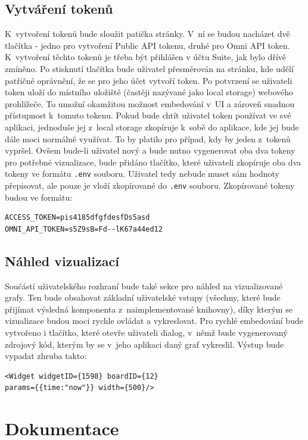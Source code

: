 \documentclass[czech, bc, kiv, he, iso690numb]{fasthesis}
\begin{document}
\subsection{Vytváření tokenů}

K~vytvoření tokenů bude sloužit patička stránky. V~ní se budou nacházet dvě tlačítka - jedno pro vytvoření Public API tokenu, druhé pro Omni API token. K~vytvoření těchto tokenů je třeba být přihlášen v
účtu Suite, jak bylo dřívě zmíněno. Po stisknutí tlačítka bude uživatel přesměrován na stránku, kde udělí patřičné oprávnění, že se pro jeho účet vytvoří token. Po potvrzení se uživateli token uloží
do místního uložiště (častěji nazývané jako local storage) webového prohlížeče. To umožní okamžitou možnost embedování v~UI a zároveň snadnou přístupnost k~tomuto tokenu. Pokud bude chtít uživatel token používat ve své aplikaci, jednoduše jej z~local storage
zkopíruje k~sobě do aplikace, kde jej bude dále moci normálně využívat. To by platilo pro případ, kdy by jeden z~tokenů vypršel. Ovšem bude-li uživatel nový a bude nutno vygenerovat oba dva tokeny pro potřebné vizualizace,
bude přidáno tlačítko, které uživateli zkopíruje oba dva tokeny ve formátu \texttt{.env} souboru. Uživatel tedy nebude muset sám hodnoty přepisovat, ale pouze je vloží zkopírované do \texttt{.env} souboru. Zkopírované tokeny
budou ve formátu:
\lstset{style=plainsrc}
\begin{lstlisting}
ACCESS_TOKEN=pis4185dfgfdesfDs5asd
OMNI_API_TOKEN=s5Z9sB=Fd--lK67a44ed12
\end{lstlisting}

\subsection{Náhled vizualizací}
Součástí uživatelského rozhraní bude také sekce pro náhled na vizualizované grafy. Ten bude obsahovat základní uživatelské vstupy (všechny, které bude přijímat výsledná komponenta z~naimplementované knihovny), 
díky kterým se vizualizace budou moci rychle ovládat a vykreslovat. Pro rychlé embedování bude vytvořeno i tlačítko, které otevře uživateli dialog, v~němž bude vygenerovaný zdrojový kód, kterým by se
v~jeho aplikaci daný graf vykreslil. Výstup bude vypadat zhruba takto:

\lstset{style=plainsrc}
\begin{lstlisting}
<Widget widgetID={1598} boardID={12} 
params={{time:"now"}} width={500}/>
\end{lstlisting}


\section{Dokumentace}
\end{document}
